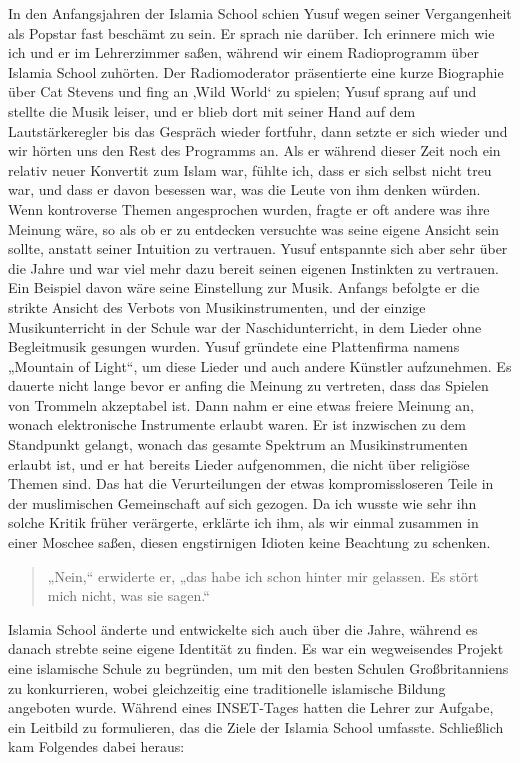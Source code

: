 \documentclass[12pt]{memoir}
\begin{document}
In den Anfangsjahren der Islamia School schien Yusuf
wegen seiner Vergangenheit als Popstar fast beschämt zu sein.
Er sprach nie darüber.
Ich erinnere mich wie ich und er im Lehrerzimmer saßen,
während wir einem Radioprogramm über Islamia School zuhörten.
Der Radiomoderator präsentierte eine kurze Biographie über Cat Stevens
und fing an ‚Wild World‘ zu spielen;
Yusuf sprang auf und stellte die Musik leiser,
und er blieb dort mit seiner Hand auf dem Lautstärkeregler
bis das Gespräch wieder fortfuhr,
dann setzte er sich wieder und wir hörten uns den Rest des Programms an.
Als er während dieser Zeit noch ein relativ neuer Konvertit zum Islam war,
fühlte ich, dass er sich selbst nicht treu war,
und dass er davon besessen war, was die Leute von ihm denken würden.
Wenn kontroverse Themen angesprochen wurden,
fragte er oft andere was ihre Meinung wäre,
so als ob er zu entdecken versuchte was seine eigene Ansicht sein sollte,
anstatt seiner Intuition zu vertrauen.
Yusuf entspannte sich aber sehr über die Jahre
und war viel mehr dazu bereit seinen eigenen Instinkten zu vertrauen.
Ein Beispiel davon wäre seine Einstellung zur Musik.
Anfangs befolgte er die strikte Ansicht des Verbots von Musikinstrumenten,
und der einzige Musikunterricht in der Schule war der Naschidunterricht,
in dem Lieder ohne Begleitmusik gesungen wurden.
Yusuf gründete eine Plattenfirma namens „Mountain of Light“,
um diese Lieder und auch andere Künstler aufzunehmen.
Es dauerte nicht lange bevor er anfing die Meinung zu vertreten,
dass das Spielen von Trommeln akzeptabel ist.
Dann nahm er eine etwas freiere Meinung an,
wonach elektronische Instrumente erlaubt waren.
Er ist inzwischen zu dem Standpunkt gelangt,
wonach das gesamte Spektrum an Musikinstrumenten erlaubt ist,
und er hat bereits Lieder aufgenommen, die nicht über religiöse Themen sind.
Das hat die Verurteilungen der etwas kompromissloseren Teile
in der muslimischen Gemeinschaft auf sich gezogen.
Da ich wusste wie sehr ihn solche Kritik früher verärgerte,
erklärte ich ihm, als wir einmal zusammen in einer Moschee saßen,
diesen engstirnigen Idioten keine Beachtung zu schenken.

\begin{quote}
„Nein,“ erwiderte er, „das habe ich schon hinter mir gelassen.
Es stört mich nicht, was sie sagen.“
\end{quote}

Islamia School änderte und entwickelte sich auch über die Jahre,
während es danach strebte seine eigene Identität zu finden.
Es war ein wegweisendes Projekt eine islamische Schule zu begründen,
um mit den besten Schulen Großbritanniens zu konkurrieren,
wobei gleichzeitig eine traditionelle islamische Bildung angeboten wurde.
Während eines INSET-Tages hatten die Lehrer zur Aufgabe,
ein Leitbild zu formulieren, das die Ziele der Islamia School umfasste.
Schließlich kam Folgendes dabei heraus:
\end{document}
